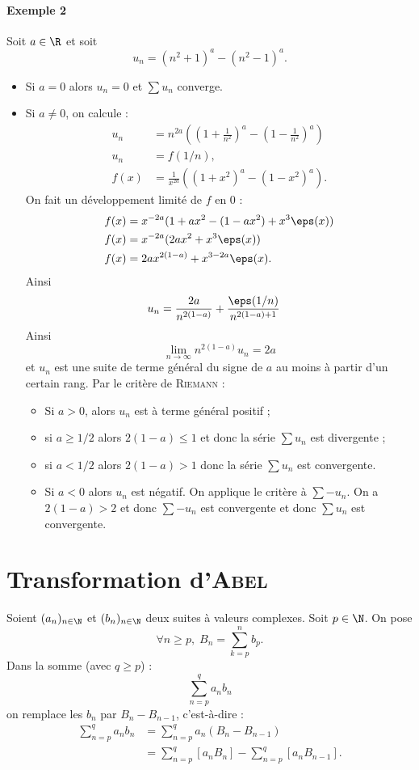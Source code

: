\documentclass{livre}
\begin{document}
\paragraph{Exemple 2}Soit $a\in \R$ et soit \[ u_n = (n^{2}+1)^{a} - (n^{2}-1)^{a}.\]
\begin{itemize}
\item Si $a = 0$ alors $u_n=0$ et $\sum u_n$ converge.
\item Si $a\neq 0$, on calcule :
\begin{align*}
u_n &= n^{2a}\left( \left( 1 + \frac{1}{n^{2}}\right)^{a} - \left(1-\frac{1}{n^{2}}\right)^{a}\right) \\
u_n &= f(1/n),\\
f(x) &= \frac{1}{x^{2a}}\left( (1+ x^{2})^{a} -(1-x^{2})^{a}\right).
\end{align*}
On fait un développement limité de $f$ en $0$ :
\begin{align*}
f(x) &= x^{-2a}(1+ax^{2}-(1-ax^{2}) + x^{3}\eps(x)) \\
f(x) &= x^{-2a}(2ax^{2}+x^{3}\eps(x))\\
f(x) &= 2ax^{2(1-a)} + x^{3-2a}\eps(x).
\end{align*}
Ainsi 
\begin{align*}
u_n &= \frac{2a}{n^{2(1-a)}} + \frac{\eps(1/n)}{n^{2(1-a)+1}}
\end{align*}
Ainsi \[ \lim_{n\to\infty} n^{2(1-a)}u_n = 2a \]et $u_n$ est une suite de terme général du signe de $a$ au moins à partir d'un certain rang.
Par le critère de \textsc{Riemann} :
\begin{itemize}
\item Si $a>0$, alors $u_n$ est à terme général positif ;
\item si $a\geq 1/2$ alors $2(1-a)\leq 1$ et donc la série $\sum u_n$ est divergente ;
\item si $a<1/2$ alors $2(1-a)>1$ donc la série $\sum u_n$ est convergente.
\item Si $a<0$ alors $u_n$ est négatif. On applique le critère à $\sum -u_n$. On a $2(1-a)>2$ et donc $\sum -u_n$ est convergente et donc $\sum u_n$ est convergente.
\end{itemize}
\end{itemize}

\section{Transformation d'\textsc{Abel}}

Soient $(a_n)_{n\in \N}$ et $(b_n)_{n\in \N}$ deux suites à valeurs complexes. Soit $p\in \N$. On pose \[ \forall n\geq p, \; B_n = \sum_{k=p}^{n} b_p.\] Dans la somme (avec $q\geq p$) : \[ \sum_{n=p}^{q}a_nb_n\]on remplace les $b_n$ par $B_n - B_{n-1}$, c'est-à-dire :
\begin{align*}
\sum_{n=p}^{q}a_nb_n &= \sum_{n=p}^{q}a_n(B_n-B_{n-1})\\
&= \sum_{n=p}^{q}[a_nB_n]  - \sum_{n=p}^{q}[a_nB_{n-1}].
\end{align*}
\end{document}

